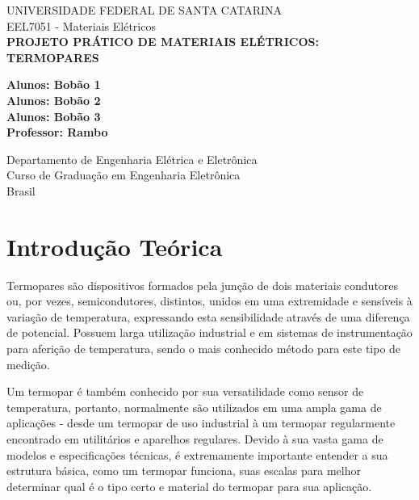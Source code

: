 \documentclass[a4paper,12pt]{report}
\begin{document}
	
	\begin{titlepage}
		\begin{center}
			
			\Large
			UNIVERSIDADE FEDERAL DE SANTA CATARINA\\
			EEL7051 - Materiais Elétricos\\
			\vspace*{5cm}
			\Huge
			\textbf{PROJETO PRÁTICO DE MATERIAIS ELÉTRICOS:}\\
			\textbf{TERMOPARES}
			
			\vspace{1.5cm}
			
			\vfill
			\Large
			\textbf{Alunos: Bobão 1}\\
			\textbf{Alunos: Bobão 2}\\
			\textbf{Alunos: Bobão 3}\\
			
			\textbf{Professor: Rambo} %
			\vspace{0.8cm}
			
			Departamento de Engenharia Elétrica e Eletrônica\\
			Curso de Graduação em Engenharia Eletrônica\\
			Brasil\\
			
			
			
		\end{center}
	\end{titlepage}
	\Large
	
	\pagebreak
	\listoffigures
    \pagebreak
    \tableofcontents
	
	\chapter{Introdução Teórica}
	
	Termopares são dispositivos formados pela junção de dois materiais condutores ou, por vezes, semicondutores, distintos, unidos em uma extremidade e sensíveis à variação de temperatura, expressando esta sensibilidade através de uma diferença de potencial. Possuem larga utilização industrial e em sistemas de instrumentação para aferição de temperatura, sendo o mais conhecido método para este tipo de medição.
	
	\noindent Um termopar é também conhecido por sua versatilidade como sensor de temperatura, portanto, normalmente são utilizados em uma ampla gama de aplicações - desde um termopar de uso industrial à um termopar regularmente encontrado em utilitários e aparelhos regulares. Devido à sua vasta gama de modelos e especificações técnicas, é extremamente importante entender a sua estrutura básica, como um termopar funciona, suas escalas para melhor determinar qual é o tipo certo e material do termopar para sua aplicação.
	
\end{document}
